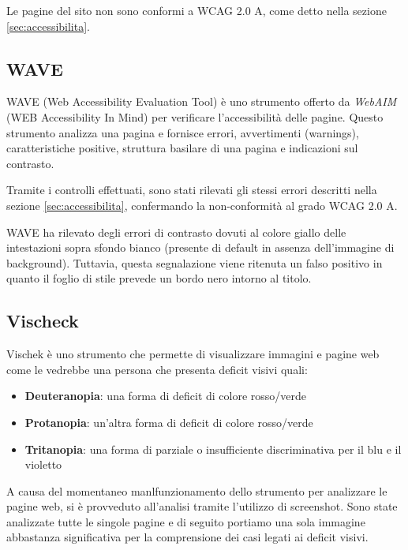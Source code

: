 Le pagine del sito non sono conformi a WCAG 2.0 A, come detto nella sezione
\ref{sec:accessibilita}.

\subsection{WAVE} %
WAVE (Web Accessibility Evaluation Tool) è uno strumento offerto da
\textit{WebAIM} (WEB Accessibility In Mind) per verificare l'accessibilità
delle pagine. Questo strumento analizza una pagina e fornisce errori,
avvertimenti (warnings), caratteristiche positive, struttura basilare di una
pagina e indicazioni sul contrasto.

Tramite i controlli effettuati, sono stati rilevati gli stessi errori
descritti nella sezione \ref{sec:accessibilita}, confermando la non-conformità
al grado WCAG 2.0 A.

WAVE ha rilevato degli errori di contrasto dovuti al colore giallo delle
intestazioni sopra sfondo bianco (presente di default in assenza dell'immagine
di background). Tuttavia, questa segnalazione viene ritenuta un falso positivo
in quanto il foglio di stile prevede un bordo nero intorno al titolo.

\subsection{Vischeck}
Vischek è uno strumento che permette di visualizzare immagini e pagine web
come le vedrebbe una persona che presenta deficit visivi quali:
\begin{itemize}
\item \textbf{Deuteranopia}: una forma di deficit di colore rosso/verde
\item \textbf{Protanopia}: un'altra forma di deficit di colore rosso/verde
\item \textbf{Tritanopia}: una forma di parziale o insufficiente
discriminativa per il blu e il violetto
\end{itemize}
A causa del momentaneo manlfunzionamento dello strumento per analizzare le pagine web, si è provveduto all'analisi tramite l'utilizzo di screenshot. Sono state analizzate tutte le singole pagine e di seguito portiamo una sola immagine abbastanza significativa per la comprensione dei casi legati ai deficit visivi.

